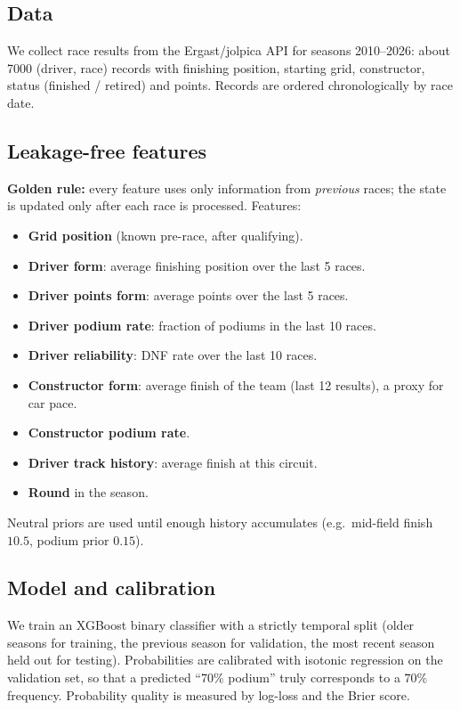 \documentclass[10pt,twocolumn]{article}
\begin{document}
\subsection{Data}
We collect race results from the Ergast/jolpica API for seasons 2010--2026:
about \num{7000} (driver, race) records with finishing position, starting grid,
constructor, status (finished / retired) and points. Records are ordered
chronologically by race date.

\subsection{Leakage-free features}
\textbf{Golden rule:} every feature uses only information from \emph{previous}
races; the state is updated only after each race is processed. Features:
\begin{itemize}[leftmargin=1.2em,itemsep=1pt]
  \item \textbf{Grid position} (known pre-race, after qualifying).
  \item \textbf{Driver form}: average finishing position over the last 5 races.
  \item \textbf{Driver points form}: average points over the last 5 races.
  \item \textbf{Driver podium rate}: fraction of podiums in the last 10 races.
  \item \textbf{Driver reliability}: DNF rate over the last 10 races.
  \item \textbf{Constructor form}: average finish of the team (last 12 results),
        a proxy for car pace.
  \item \textbf{Constructor podium rate}.
  \item \textbf{Driver track history}: average finish at this circuit.
  \item \textbf{Round} in the season.
\end{itemize}
Neutral priors are used until enough history accumulates (e.g.\ mid-field finish
$10.5$, podium prior $0.15$).

\subsection{Model and calibration}
We train an XGBoost binary classifier with a strictly temporal split (older
seasons for training, the previous season for validation, the most recent season
held out for testing). Probabilities are calibrated with isotonic regression on
the validation set, so that a predicted ``$70\%$ podium'' truly corresponds to a
$70\%$ frequency. Probability quality is measured by log-loss and the Brier
score.
\end{document}
